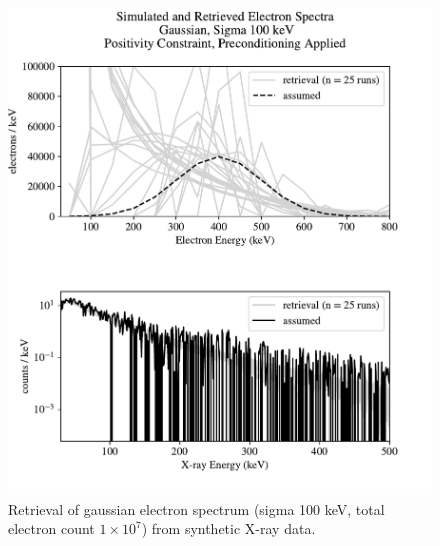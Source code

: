 \begin{figure}[p]
    \centering
    \includegraphics[width=\textwidth]{figures/chapter_4/synthetic_data_examples/gauss_100keV_posonly_preconditioning_1e7_particles}
    \caption{Retrieval of gaussian electron spectrum (sigma 100 keV, total electron count $1\times10^7$) from synthetic X-ray data.}
    \label{why_non_negative_is_good}
\end{figure}

